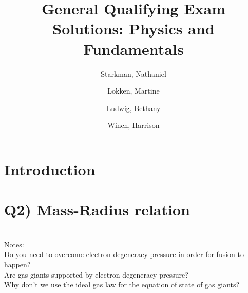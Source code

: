 \documentclass[\main/main.tex]{subfiles}
\title{General Qualifying Exam Solutions: Physics and Fundamentals\\}
\author{{Starkman}, Nathaniel \\%
		\and {Lokken}, Martine \\%
		\and {Ludwig}, Bethany \\%
		\and {Winch}, Harrison%
}
\begin{document}


\maketitle


\tableofcontents
\let\tableofcontents\relax



\newpage
\section{Introduction} %
\label{sec:introduction}









\section{Q2) Mass-Radius relation} %
\label{sec:q2_mass_radius_relation}
\\

Notes:\\
Do you need to overcome electron degeneracy pressure in order for fusion to happen?\\
Are gas giants supported by electron degeneracy pressure?\\
Why don't we use the ideal gas law for the equation of state of gas giants?\\
\end{document}

